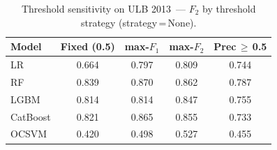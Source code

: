 \begin{table}[ht]
\centering
\caption{Threshold sensitivity on ULB 2013~--- $F_2$ by threshold strategy (strategy\,=\,None).}
\label{tab:threshold_ulb_f2}
\begin{tabular}{l c c c c}
\toprule
Model & Fixed (0.5) & max-$F_1$ & max-$F_2$ & Prec\,$\geq$\,0.5 \\
\midrule
LR         & 0.664 & 0.797 & 0.809 & 0.744 \\
RF         & 0.839 & 0.870 & 0.862 & 0.787 \\
LGBM       & 0.814 & 0.814 & 0.847 & 0.755 \\
CatBoost   & 0.821 & 0.865 & 0.855 & 0.733 \\
OCSVM      & 0.420 & 0.498 & 0.527 & 0.455 \\
\bottomrule
\end{tabular}
\end{table}